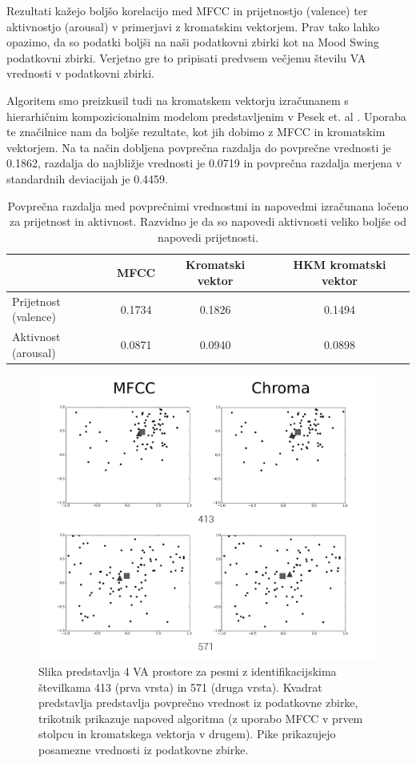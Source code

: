 \documentclass[a4paper, 12pt]{book}
\begin{document}
{Rezultati kažejo boljšo korelacijo med MFCC in prijetnostjo (valence) ter aktivnostjo (arousal) v primerjavi z kromatskim vektorjem. Prav tako lahko opazimo, da so podatki boljši na naši podatkovni zbirki kot na Mood Swing podatkovni zbirki. Verjetno gre to pripisati predvsem večjemu številu VA vrednosti v podatkovni zbirki. 

Algoritem smo preizkusil tudi na kromatskem vektorju izračunanem s hierarhičnim kompozicionalnim modelom predstavljenim v Pesek et. al \cite{Pesek2013}. Uporaba te značilnice nam da boljše rezultate, kot jih dobimo z MFCC in kromatskim vektorjem. Na ta način dobljena povprečna razdalja do povprečne vrednosti je 0.1862, razdalja do najbližje vrednosti je 0.0719 in povprečna razdalja merjena v standardnih deviacijah je 0.4459. 

\begin{table}[htb]
\begin{center}
\caption{Povprečna razdalja med povprečnimi vrednostmi in napovedmi izračunana ločeno za prijetnost in aktivnost. Razvidno je da so napovedi aktivnosti veliko boljše od napovedi prijetnosti. }
\begin{tabular}{|l|c|c|c|}
\hline
 & MFCC & Kromatski vektor & HKM kromatski vektor \\
\hline
Prijetnost (valence) & 0.1734 & 0.1826 & 0.1494\\
Aktivnost (arousal) & 0.0871 & 0.0940 & 0.0898\\
\hline
\end{tabular}
\label{seperateresults}
\end{center}
\end{table}

\begin{figure}[h!bt]
\centering
\includegraphics[width=130mm]{images/graphs1.png}
\caption{Slika predstavlja 4 VA prostore za pesmi z identifikacijskima številkama 413 (prva vrsta) in 571 (druga vrsta). Kvadrat predstavlja predstavlja povprečno vrednost iz podatkovne zbirke, trikotnik prikazuje napoved algoritma (z uporabo MFCC v prvem stolpcu in kromatskega vektorja v drugem). Pike prikazujejo posamezne vrednosti iz podatkovne zbirke.}
\label{graphs}
\end{figure}

}
\end{document}
